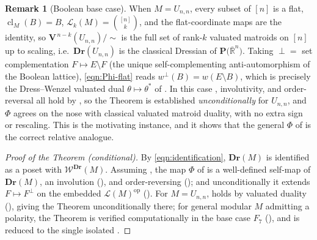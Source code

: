 \documentclass{article}
\theoremstyle{definition}
\newtheorem{remark}[theorem]{Remark}
\newcommand{\Rbar}{\overline{\mathbb{R}}}
\newcommand{\cl}{\operatorname{cl}}
\newcommand{\op}{\operatorname{op}}
\newcommand{\Dr}{\mathbf{Dr}}
\newcommand{\bV}{\mathbf V}
\newcommand{\cLL}{\mathcal{L}}
\newcommand{\cW}{\mathcal{W}}
\newcommand{\PT}[1]{\mathbf{P}\big(\Rbar^{#1}\big)}
\begin{document}
\begin{remark}[Boolean base case]\label{rmk:Unn}
When $M=U_{n,n}$, every subset of $[n]$ is a flat, $\cl_M(B)=B$, $\cLL_k(M)=\binom{[n]}{k}$, and the
flat-coordinate maps are the identity, so $\bV^{\,n-k}(U_{n,n})/\!\sim$ is the full set of rank-$k$
valuated matroids on $[n]$ up to scaling, i.e.\ $\Dr(U_{n,n})$ is the classical Dressian of $\PT{n}$.
Taking $\perp=$ set complementation $F\mapsto E\setminus F$ (the unique self-complementing
anti-automorphism of the Boolean lattice), \eqref{eqn:Phi-flat} reads $w^{\perp}(B)=w(E\setminus B)$,
which is precisely the Dress--Wenzel valuated dual $\theta\mapsto\theta^{*}$ of . In
this case , involutivity, and order-reversal all hold by ,
so the Theorem is established \emph{unconditionally} for $U_{n,n}$, and $\Phi$ agrees on the nose with
classical valuated matroid duality, with no extra sign or rescaling. This is the motivating instance,
and it shows that the general $\Phi$ of  is the correct relative analogue.
\end{remark}

\begin{proof}[Proof of the Theorem (conditional)]
By \eqref{eqn:identification}, $\Dr(M)$ is identified as a poset with $\cW^{\Dr}(M)$. Assuming
, the map $\Phi$ of  is a well-defined self-map of $\Dr(M)$,
an involution (), and order-reversing (); and unconditionally it
extends $F\mapsto F^{\perp}$ on the embedded $\cLL(M)^{\op}$ (). For $M=U_{n,n}$,
 holds by valuated duality (), giving the Theorem
unconditionally there; for general modular $M$ admitting a polarity, the Theorem is verified
computationally in the base case $F_7$ (), and is reduced to the single isolated
.
\end{proof}
\end{document}
